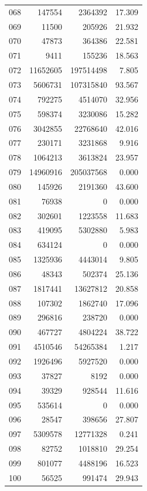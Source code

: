 \documentclass[anonymous,notoc]{gmcm2026}
\begin{document}
\begin{longtable}{lrrr}
068 & 147554 & 2364392 & 17.309 \\
069 & 11500 & 205926 & 21.932 \\
070 & 47873 & 364386 & 22.581 \\
071 & 9411 & 155236 & 18.563 \\
072 & 11652605 & 197514498 & 7.805 \\
073 & 5606731 & 107315840 & 93.567 \\
074 & 792275 & 4514070 & 32.956 \\
075 & 598374 & 3230086 & 15.282 \\
076 & 3042855 & 22768640 & 42.016 \\
077 & 230171 & 3231868 & 9.916 \\
078 & 1064213 & 3613824 & 23.957 \\
079 & 14960916 & 205037568 & 0.000 \\
080 & 145926 & 2191360 & 43.600 \\
081 & 76938 & 0 & 0.000 \\
082 & 302601 & 1223558 & 11.683 \\
083 & 419095 & 5302880 & 5.983 \\
084 & 634124 & 0 & 0.000 \\
085 & 1325936 & 4443014 & 9.805 \\
086 & 48343 & 502374 & 25.136 \\
087 & 1817441 & 13627812 & 20.858 \\
088 & 107302 & 1862740 & 17.096 \\
089 & 296816 & 238720 & 0.000 \\
090 & 467727 & 4804224 & 38.722 \\
091 & 4510546 & 54265384 & 1.217 \\
092 & 1926496 & 5927520 & 0.000 \\
093 & 37827 & 8192 & 0.000 \\
094 & 39329 & 928544 & 11.616 \\
095 & 535614 & 0 & 0.000 \\
096 & 28547 & 398656 & 27.807 \\
097 & 5309578 & 12771328 & 0.241 \\
098 & 82752 & 1018810 & 29.254 \\
099 & 801077 & 4488196 & 16.523 \\
100 & 56525 & 991474 & 29.943 \\
\end{longtable}
\end{document}
